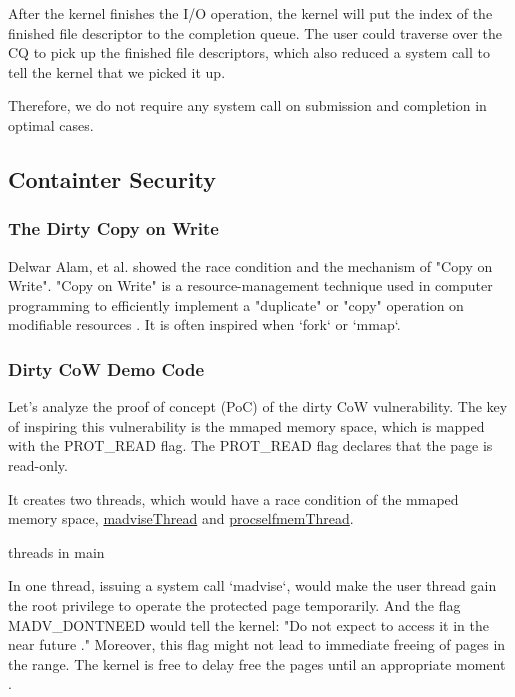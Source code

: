 \documentclass[12pt,a4paper]{article}
\begin{document}
After the kernel finishes the I/O operation, the kernel will put the index of the finished
file descriptor to the completion queue. The user could traverse over the CQ to pick up
the finished file descriptors, which also reduced a system call to tell the kernel that
we picked it up.

Therefore, we do not require any system call on submission and completion in optimal cases.

\subsection{Containter Security}
\hypertarget{security}{}
\subsubsection{The Dirty Copy on Write}
Delwar Alam, et al. \cite{Study_Dirty_Cow} showed the race condition and the mechanism of
"Copy on Write". "Copy on Write" is a resource-management technique used in
computer programming to efficiently implement a "duplicate" or "copy" operation
on modifiable resources \cite{CoW_wiki}. It is often inspired when `fork` or `mmap`.

\subsubsection{Dirty CoW Demo Code}
Let's analyze the proof of concept (PoC) of the dirty CoW \cite{Dirty_CoW} vulnerability.
The key of inspiring this vulnerability is the mmaped memory space, which is mapped with
the PROT\_READ flag. The PROT\_READ flag declares that the page is read-only.


It creates two threads, which would have a race condition of the mmaped memory space,
\hyperlink{madvise}{madviseThread} and \hyperlink{procself}{procselfmemThread}.

\hypertarget{threads_main}{threads in main}


In one thread, issuing a system call `madvise`, would make the user thread gain the root
privilege to operate the protected page temporarily. And the flag MADV\_DONTNEED would
tell the kernel: "Do not expect to access it in the near future \cite{Madvise}." Moreover,
this flag might not lead to immediate freeing of pages in the range. The kernel is free
to delay free the pages until an appropriate moment \cite{Madvise}.
\end{document}
